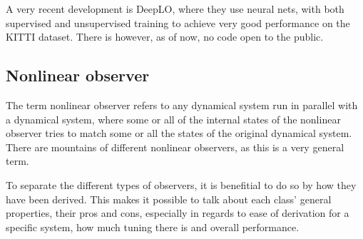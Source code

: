 A very recent development is DeepLO\cite{DeepLO}, where they use neural nets, with both supervised and unsupervised training to achieve very good performance on the KITTI dataset. There is however, as of now, no code open to the public.

\subsection{Nonlinear observer}

The term nonlinear observer refers to any dynamical system run in parallel with a dynamical system, where some or all of the internal states of the nonlinear observer tries to match some or all the states of the original dynamical system. There are mountains of different nonlinear observers, as this is a very general term. 

To separate the different types of observers, it is benefitial to do so by how they have been derived. This makes it possible to talk about each class' general properties, their pros and cons, especially in regards to ease of derivation for a specific system, how much tuning there is and overall performance.

